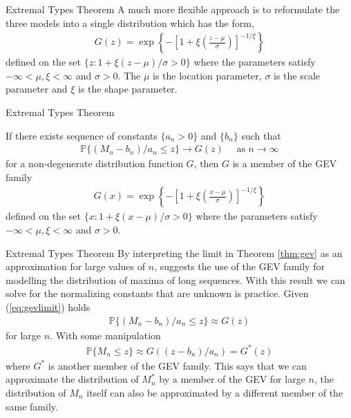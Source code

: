 \documentclass[10pt]{beamer}
\begin{document}
\begin{frame}{Extremal Types Theorem}
A much more flexible approach is to reformulate the three models into a single distribution which has the form,
\begin{align}\label{eq:gev}
G(z) = \exp \left\{-\left[1+\xi\left(\frac{z-\mu}{\sigma}\right)\right]^{-1/\xi}\right\}
\end{align}
defined on the set $\{z : 1 + \xi(z-\mu)/\sigma>0\}$ where the parameters satisfy $-\infty<\mu, \xi<\infty$ and $\sigma >0$. The $\mu$ is the location parameter, $\sigma$ is the scale parameter and $\xi$ is the shape parameter.

\end{frame}

\begin{frame}{Extremal Types Theorem}
\begin{theorem}\label{thm:gev}
If there exists sequence of constants $\{a_n>0\}$ and $\{b_n\}$ such that 
\begin{align}\label{eq:gevlimit}
\mathbb{P}\{(M_n - b_n)/a_n\leq z\} \to G(z) \quad\text{ as } n \to \infty
\end{align}
for a non-degenerate distribution function $G$, then $G$ is a member of the GEV family
\begin{align}
G(x) = \exp \left\{-\left[1+\xi\left(\frac{x-\mu}{\sigma}\right)\right]^{-1/\xi}\right\}
\end{align}
defined on the set $\{x : 1 + \xi(x-\mu)/\sigma>0\}$ where the parameters satisfy $-\infty<\mu, \xi<\infty$ and $\sigma >0$.
\end{theorem}
\end{frame}

\begin{frame}{Extremal Types Theorem}
By interpreting the limit in Theorem \ref{thm:gev} as an approximation for large values of $n$, suggests the use of the GEV family for modelling the distribution of maxima of long sequences. With this result we can solve for the normalizing constants that are unknown is practice. Given (\ref{eq:gevlimit}) holds
\begin{align*}
\mathbb{P}\{(M_n-b_n)/a_n\leq z\} \approx G(z)
\end{align*}
for large $n$. With some manipulation 
\begin{align*}
\mathbb{P}\{M_n\leq z\} \approx G((z-b_n)/a_n) = G^\ast(z)
\end{align*}
where $G^\ast$ is another member of the GEV family. This says that we can approximate the distribution of $M_n^\ast$ by a member of the GEV for large $n$, the distribution of $M_n$ itself can also be approximated by a different member of the same family.
\end{frame}
\end{document}
